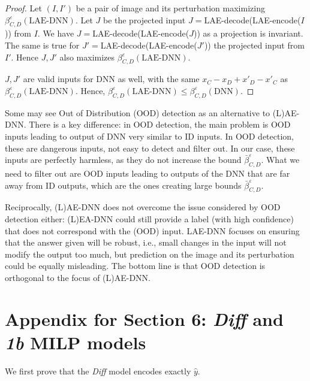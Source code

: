 \begin{proof}[Proof] 
	Let $(I,I')$ be a pair of image and its perturbation maximizing $\beta^\varepsilon_{C,D}(\text{LAE-DNN})$. Let $J$ be the projected input 
	$J=$LAE-decode(LAE-encode($I$)) from $I$.
	We have $J=$LAE-decode(LAE-encode($J$)) as a projection is invariant.
	The same is true for $J'=$LAE-decode(LAE-encode($J'$)) the projected input
	from $I'$. 
	Hence $J,J'$ also maximizes $\beta^\varepsilon_{C,D}(\text{LAE-DNN})$.
	
    $J,J'$ are valid inputs for DNN as well, with the same $x_C-x_D+x'_D-x'_C$
	as $\beta^\varepsilon_{C,D}(\text{LAE-DNN})$. Hence, $\beta^\varepsilon_{C,D}(\text{LAE-DNN}) \leq \beta^{\varepsilon}_{C,D}(\text{DNN})$.
\end{proof}

Some may see Out of Distribution (OOD) detection as an alternative to (L)AE-DNN. 
There is a key difference: in OOD detection, the main problem is OOD inputs leading to output of DNN very similar to ID inputs. In OOD detection, these are dangerous inputs, not easy to detect and filter out. 
In our case, these inputs are perfectly harmless, as 
they do not increase the bound $\bar{\beta}^{\varepsilon}_{C,D}$. 
What we need to filter out are OOD inputs leading to outputs of the DNN that are far away from ID outputs, which are the ones creating large bounds $\bar{\beta}^{\varepsilon}_{C,D}$.

Reciprocally, (L)AE-DNN does not overcome the issue considered by OOD detection either: (L)EA-DNN could still provide a label (with high confidence) that does not correspond with the (OOD) input. LAE-DNN focuses on ensuring that the answer given will be robust, i.e., small changes in the input will not modify the output too much, but prediction on the image and its perturbation could be equally misleading. The bottom line is that OOD detection is orthogonal to the focus of (L)AE-DNN.


\section{Appendix for Section 6: {\em Diff} and {\em 1b} MILP models}

We first prove that the {\em Diff} model encodes exactly $\hat{y}$.

